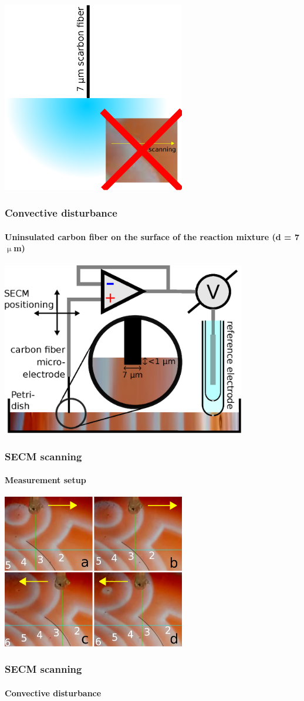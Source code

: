 \documentclass{beamer}
\begin{document}
\begin{frame}
	\centering
	\includegraphics[width=0.6\textwidth]{szigeteles4.eps}
	\frametitle{Convective disturbance}
	\framesubtitle{Uninsulated carbon fiber on the surface of the reaction mixture (d = 7 $\upmu$m)}
\end{frame}

\begin{frame}
	\centering
	\includegraphics[width=0.8\textwidth]{setup.eps}
	\frametitle{SECM scanning}
	\framesubtitle{Measurement setup}
\end{frame}

\begin{frame}
	\centering
	\includegraphics[width=0.6\textwidth]{grabs.png}
	\frametitle{SECM scanning}
	\framesubtitle{Convective disturbance}
\end{frame}
\end{document}
